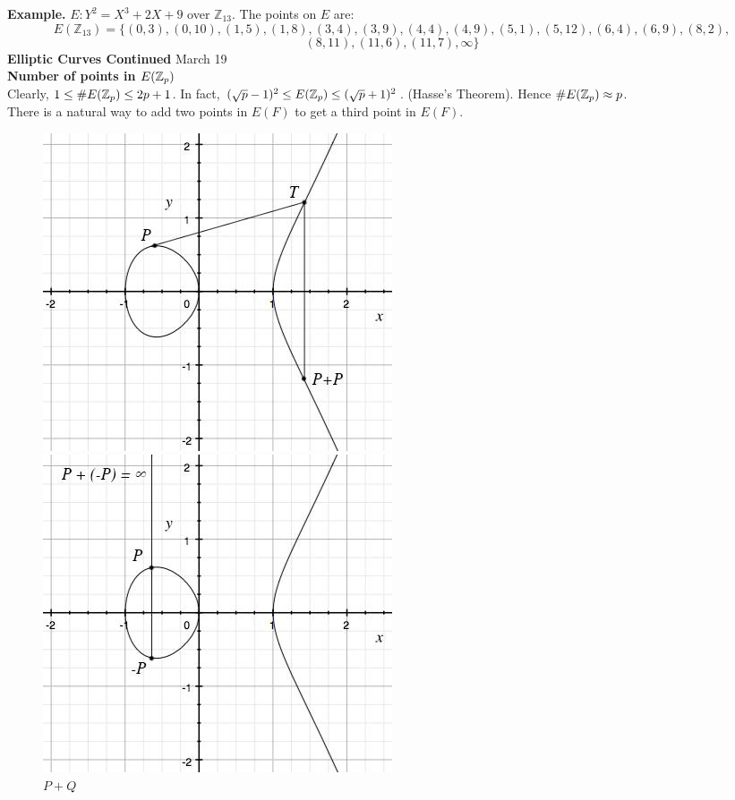 \documentclass[a4paper,12pt]{article}
\begin{document}
{\bf Example.}
$E: Y^2 = X^3 + 2X + 9$ over $\mathbb{Z}_{13}$. The points on $E$ are:
\[
E(\mathbb{Z}_{13}) = \{(0,3),(0,10),(1,5),(1,8),(3,4),(3,9),(4,4),(4,9),(5,1),(5,12),(6,4),(6,9),(8,2),
\]\[
(8,11),(11,6),(11,7),\infty\}
\]
\clearpage
{\bf Elliptic Curves Continued}  \hfill March 19
\\[1em]
{\bf Number of points in $E(\mathbb{Z}_p)$}
\\[1em]
Clearly, $1\le \# E(\mathbb{Z}_p)\le 2p+1$.  In fact,
$(\sqrt p -1)^{2} \le E(\mathbb{Z}_p)\le (\sqrt p +1)^{2}$.
(Hasse's Theorem).
Hence $\#E(\mathbb{Z}_p)\approx p$.
\\[1em]
There is a natural way to add two points in $E(F)$ to get
a third point in $E(F)$.
\begin{figure}[h!]
\centering
\begin{minipage}{0.45\textwidth}
\includegraphics[width=\textwidth]{fig-mar19-1}
\caption{$P+Q$}
\end{minipage}
\hspace{0.05\textwidth}
\begin{minipage}{0.45\textwidth}
\includegraphics[width=\textwidth]{fig-mar19-2}

\end{minipage}
\end{figure}
\end{document}

